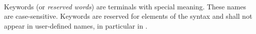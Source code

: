 
\begin{grammar}
\oneof \\
\end{grammar}

\specsubitem
Keywords (or \textit{reserved words}) are terminals with special meaning. These
names are case-sensitive. Keywords are reserved for elements of the syntax
and shall not appear in user-defined names, in particular in
.

